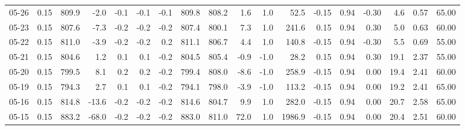 \begin{threeparttable}
{\begin{tabular}{lrrrrrrrrrrrrrrrrr}
  05-26 &     0.15 & 809.9 &              -2.0 &              -0.1 &               -0.1 &               -0.1 & 809.8 & 808.2 &        1.6 &                      1.0 &                52.5 &      -0.15 &      0.94 &          -0.30 &              4.6 &            0.57 &                  65.00 \\
  05-23 &     0.15 & 807.6 &              -7.3 &              -0.2 &               -0.2 &               -0.2 & 807.4 & 800.1 &        7.3 &                      1.0 &               241.6 &       0.15 &      0.94 &           0.30 &              5.0 &            0.63 &                  60.00 \\
  05-22 &     0.15 & 811.0 &              -3.9 &              -0.2 &               -0.2 &                0.2 & 811.1 & 806.7 &        4.4 &                      1.0 &               140.8 &      -0.15 &      0.94 &          -0.30 &              5.5 &            0.69 &                  55.00 \\
  05-21 &     0.15 & 804.6 &               1.2 &               0.1 &                0.1 &               -0.2 & 804.5 & 805.4 &       -0.9 &                     -1.0 &                28.2 &       0.15 &      0.94 &           0.30 &             19.1 &            2.37 &                  55.00 \\
  05-20 &     0.15 & 799.5 &               8.1 &               0.2 &                0.2 &               -0.2 & 799.4 & 808.0 &       -8.6 &                     -1.0 &               258.9 &      -0.15 &      0.94 &           0.00 &             19.4 &            2.41 &                  60.00 \\
  05-19 &     0.15 & 794.3 &               2.7 &               0.1 &                0.1 &               -0.2 & 794.1 & 798.0 &       -3.9 &                     -1.0 &               113.2 &      -0.15 &      0.94 &           0.00 &             19.2 &            2.41 &                  65.00 \\
  05-16 &     0.15 & 814.8 &             -13.6 &              -0.2 &               -0.2 &               -0.2 & 814.6 & 804.7 &        9.9 &                      1.0 &               282.0 &      -0.15 &      0.94 &           0.00 &             20.7 &            2.58 &                  65.00 \\
  05-15 &     0.15 & 883.2 &             -68.0 &              -0.2 &               -0.2 &               -0.2 & 883.0 & 811.0 &       72.0 &                      1.0 &              1986.9 &      -0.15 &      0.94 &           0.00 &             20.4 &            2.51 &                  60.00 \\

\end{tabular}}
\end{threeparttable}
